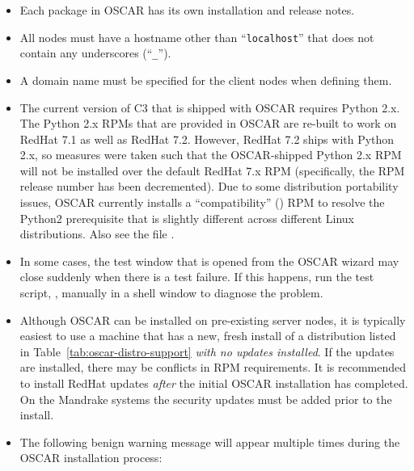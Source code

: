 \begin{itemize}
\item Each package in OSCAR has its own installation and release
  notes.   

\item All nodes must have a hostname other than ``{\tt localhost}''
  that does not contain any underscores (``{\tt \_}'').
  
\item A domain name must be specified for the client nodes when
  defining them.
  
\item The current version of C3 that is shipped with OSCAR requires
  Python 2.x.  The Python 2.x RPMs that are provided in OSCAR are
  re-built to work on RedHat 7.1 as well as RedHat 7.2.  However,
  RedHat 7.2 ships with Python 2.x, so measures were taken such that
  the OSCAR-shipped Python 2.x RPM will not be installed over the
  default RedHat 7.x RPM (specifically, the RPM release number has
  been decremented).  Due to some distribution portability issues,
  OSCAR currently installs a ``compatibility''
  () RPM to resolve the Python2
  prerequisite that is slightly different across different Linux
  distributions.  Also see the file
  .

\item In some cases, the test window that is opened from the 
  OSCAR wizard may close suddenly when there is a test failure. If
  this happens, run the test script, ,
  manually in a shell window to diagnose the problem.
 
\item Although OSCAR can be installed on pre-existing server nodes, it
  is typically easiest to use a machine that has a new, fresh install
\begchange
  of a distribution listed in Table~\ref{tab:oscar-distro-support}
  {\em with no updates installed}.  If the updates are installed,
  there may be conflicts in RPM requirements.  It is recommended to
  install RedHat updates {\em after} the initial OSCAR installation has
  completed.  On the Mandrake systems the security updates must be added
  prior to the install.
\endchange
  
\item The following benign warning message will appear multiple times
  during the OSCAR installation process:


\end{itemize}
